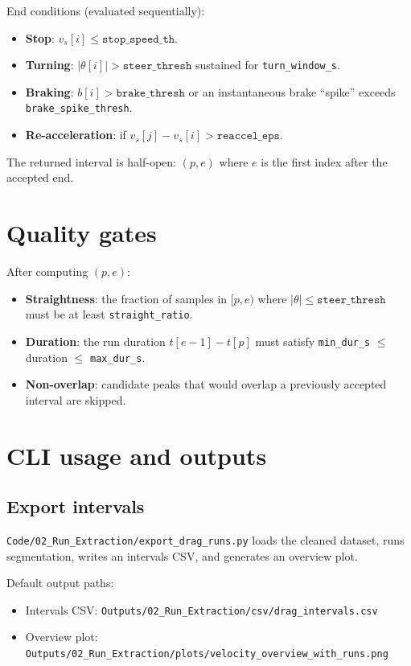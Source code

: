 \documentclass[11pt,a4paper]{article}
\begin{document}
End conditions (evaluated sequentially):
\begin{itemize}
  \item \textbf{Stop}: $v_s[i] \le \texttt{stop\_speed\_th}$.
  \item \textbf{Turning}: $|\theta[i]| > \texttt{steer\_thresh}$ sustained for \texttt{turn\_window\_s}.
  \item \textbf{Braking}: $b[i] > \texttt{brake\_thresh}$ or an instantaneous brake ``spike'' exceeds \texttt{brake\_spike\_thresh}.
  \item \textbf{Re-acceleration}: if $v_s[j] - v_s[i] > \texttt{reaccel\_eps}$.
\end{itemize}

The returned interval is half-open: $(p,e)$ where $e$ is the first index after the accepted end.

\section{Quality gates}
After computing $(p,e)$:
\begin{itemize}
  \item \textbf{Straightness}: the fraction of samples in $[p,e)$ where $|\theta| \le \texttt{steer\_thresh}$ must be at least \texttt{straight\_ratio}.
  \item \textbf{Duration}: the run duration $t[e-1]-t[p]$ must satisfy \texttt{min\_dur\_s} $\le$ duration $\le$ \texttt{max\_dur\_s}.
  \item \textbf{Non-overlap}: candidate peaks that would overlap a previously accepted interval are skipped.
\end{itemize}

\section{CLI usage and outputs}
\subsection*{Export intervals}
  \texttt{Code/02\_Run\_Extraction/export\_drag\_runs.py} loads the cleaned dataset, runs segmentation, writes an intervals CSV, and generates an overview plot.

Default output paths:
\begin{itemize}
  \item Intervals CSV: \texttt{Outputs/02\_Run\_Extraction/csv/drag\_intervals.csv}
  \item Overview plot: \texttt{Outputs/02\_Run\_Extraction/plots/velocity\_overview\_with\_runs.png}
\end{itemize}
\end{document}
